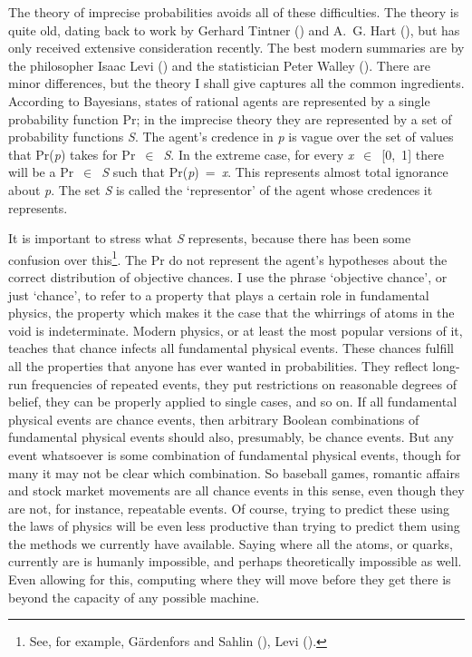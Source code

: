 \documentclass[
  10pt,
  letterpaper,
  DIV=11,
  numbers=noendperiod,
  twoside]{scrartcl}
\begin{document}
The theory of imprecise probabilities avoids all of these difficulties.
The theory is quite old, dating back to work by Gerhard Tintner
() and A.~G. Hart
(), but has only received extensive
consideration recently. The best modern summaries are by the philosopher
Isaac Levi () and the statistician Peter
Walley (). There are minor differences,
but the theory I shall give captures all the common ingredients.
According to Bayesians, states of rational agents are represented by a
single probability function Pr; in the imprecise theory they are
represented by a set of probability functions \emph{S}. The agent's
credence in \emph{p} is vague over the set of values that Pr(\emph{p})
takes for Pr~\(\in\)~\emph{S}. In the extreme case, for every
\emph{x}~\(\in\)~{[}0,~1{]} there will be a Pr~\(\in\)~\emph{S} such
that Pr(\emph{p})~=~\emph{x}. This represents almost total ignorance
about \emph{p}. The set \emph{S} is called the `representor' of the
agent whose credences it represents.

It is important to stress what \emph{S} represents, because there has
been some confusion over this\footnote{See, for example, Gärdenfors and
  Sahlin (), Levi
  ().}. The Pr do not represent the agent's
hypotheses about the correct distribution of objective chances. I use
the phrase `objective chance', or just `chance', to refer to a property
that plays a certain role in fundamental physics, the property which
makes it the case that the whirrings of atoms in the void is
indeterminate. Modern physics, or at least the most popular versions of
it, teaches that chance infects all fundamental physical events. These
chances fulfill all the properties that anyone has ever wanted in
probabilities. They reflect long-run frequencies of repeated events,
they put restrictions on reasonable degrees of belief, they can be
properly applied to single cases, and so on. If all fundamental physical
events are chance events, then arbitrary Boolean combinations of
fundamental physical events should also, presumably, be chance events.
But any event whatsoever is some combination of fundamental physical
events, though for many it may not be clear which combination. So
baseball games, romantic affairs and stock market movements are all
chance events in this sense, even though they are not, for instance,
repeatable events. Of course, trying to predict these using the laws of
physics will be even less productive than trying to predict them using
the methods we currently have available. Saying where all the atoms, or
quarks, currently are is humanly impossible, and perhaps theoretically
impossible as well. Even allowing for this, computing where they will
move before they get there is beyond the capacity of any possible
machine.
\end{document}
